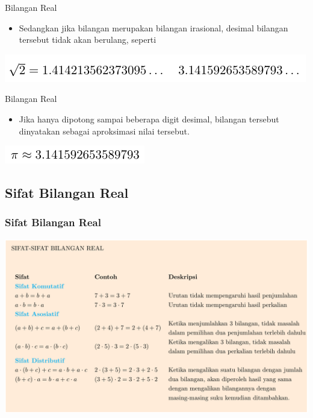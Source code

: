\documentclass[pdflatex,compress,mathserif]{beamer}
\begin{document}
\begin{frame}{Bilangan Real}
	\begin{itemize}
		\item Sedangkan jika bilangan merupakan bilangan irasional, desimal bilangan tersebut tidak akan berulang, seperti
	\end{itemize}
	\begin{center}
		\includegraphics[width=0.7\linewidth]{img/img03}
	\end{center}
\end{frame}

\begin{frame}{Bilangan Real}
	\begin{itemize}
		\item Jika hanya dipotong sampai beberapa digit desimal, bilangan tersebut dinyatakan sebagai aproksimasi nilai tersebut.
	\end{itemize}
	\begin{center}
		\includegraphics[width=0.4\linewidth]{img/img04}
	\end{center}
\end{frame}

\subsection{Sifat Bilangan Real}

\begin{frame}
	\frametitle{Sifat Bilangan Real}
	\begin{center}
		\includegraphics[width=\linewidth]{img/img05}
	\end{center}
\end{frame}
\end{document}
